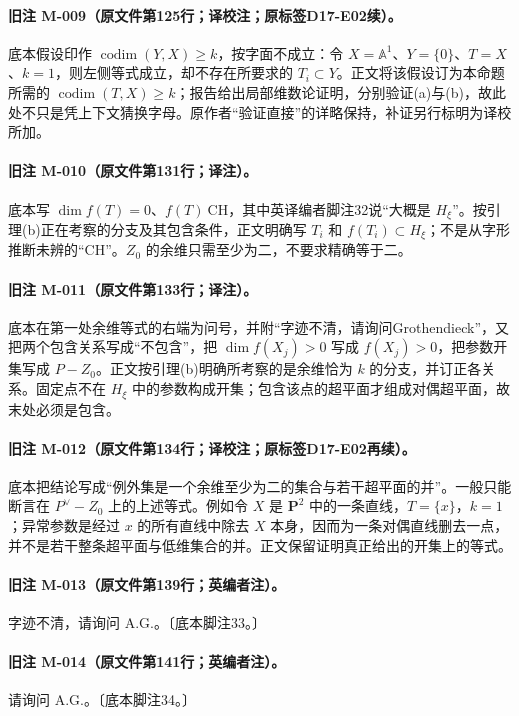 \documentclass[UTF8,a4paper]{ctexbook}
\DeclareMathOperator{\codim}{codim}
\begin{document}
\paragraph{旧注 M-009（原文件第125行；译校注；原标签D17-E02续）。}
底本假设印作 $\codim(Y,X)\geq k$，按字面不成立：令 $X=\mathbb A^1$、$Y=\{0\}$、$T=X$、$k=1$，则左侧等式成立，却不存在所要求的 $T_i\subset Y$。正文将该假设订为本命题所需的 $\codim(T,X)\geq k$；报告给出局部维数论证明，分别验证(a)与(b)，故此处不只是凭上下文猜换字母。原作者“验证直接”的详略保持，补证另行标明为译校所加。

\paragraph{旧注 M-010（原文件第131行；译注）。}
底本写 $\dim f(T)=0$、$f(T)\ \mathrm{CH}$，其中英译编者脚注32说“大概是 $H_\xi$”。按引理(b)正在考察的分支及其包含条件，正文明确写 $T_i$ 和 $f(T_i)\subset H_\xi$；不是从字形推断未辨的“CH”。$Z_0$ 的余维只需至少为二，不要求精确等于二。

\paragraph{旧注 M-011（原文件第133行；译注）。}
底本在第一处余维等式的右端为问号，并附“字迹不清，请询问Grothendieck”，又把两个包含关系写成“不包含”，把 $\dim f(X_j)>0$ 写成 $f(X_j)>0$，把参数开集写成 $P-Z_0$。正文按引理(b)明确所考察的是余维恰为 $k$ 的分支，并订正各关系。固定点不在 $H_\xi$ 中的参数构成开集；包含该点的超平面才组成对偶超平面，故末处必须是包含。

\paragraph{旧注 M-012（原文件第134行；译校注；原标签D17-E02再续）。}
底本把结论写成“例外集是一个余维至少为二的集合与若干超平面的并”。一般只能断言在 $P^\vee-Z_0$ 上的上述等式。例如令 $X$ 是 $\mathbf P^2$ 中的一条直线，$T=\{x\}$，$k=1$；异常参数是经过 $x$ 的所有直线中除去 $X$ 本身，因而为一条对偶直线删去一点，并不是若干整条超平面与低维集合的并。正文保留证明真正给出的开集上的等式。

\paragraph{旧注 M-013（原文件第139行；英编者注）。}
字迹不清，请询问 A.G.。〔底本脚注33。〕

\paragraph{旧注 M-014（原文件第141行；英编者注）。}
请询问 A.G.。〔底本脚注34。〕
\end{document}
